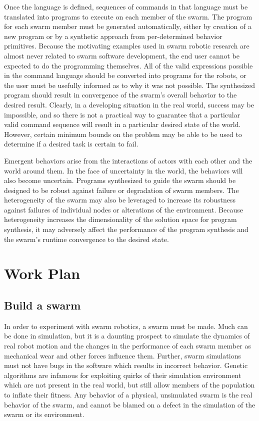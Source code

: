 \documentclass[]{article}
\begin{document}
Once the language is defined, sequences of commands in that language must be translated into programs to execute on each member of the swarm. 
The program for each swarm member must be generated automatically, either by creation of a new program or by a synthetic approach from per-determined behavior primitives.
Because the motivating examples used in swarm robotic research are almost never related to swarm software development, the end user cannot be expected to do the programming themselves. 
All of the valid expressions possible in the command language should be converted into programs for the robots, or the user must be usefully informed as to why it was not possible. 
The synthesized program should result in convergence of the swarm's overall behavior to the desired result. 
Clearly, in a developing situation in the real world, success may be impossible, and so there is not a practical way to guarantee that a particular valid command sequence will result in a particular desired state of the world. 
However, certain minimum bounds on the problem may be able to be used to determine if a desired task is certain to fail.

Emergent behaviors arise from the interactions of actors with each other and the world around them. 
In the face of uncertainty in the world, the behaviors will also become uncertain. 
Programs synthesized to guide the swarm should be designed to be robust against failure or degradation of swarm members. 
The heterogeneity of the swarm may also be leveraged to increase its robustness against failures of individual nodes or alterations of the environment. 
Because heterogeneity increases the dimensionality of the solution space for program synthesis, it may adversely affect the performance of the program synthesis and the swarm's runtime convergence to the desired state.


\section{Work Plan}

\subsection{Build a swarm}

In order to experiment with swarm robotics, a swarm must be made.
Much can be done in simulation, but it is a daunting prospect to simulate the dynamics of real robot motion and the changes in the performance of each swarm member as mechanical wear and other forces influence them. 
Further, swarm simulations must not have bugs in the software which results in incorrect behavior. 
Genetic algorithms are infamous for exploiting quirks of their simulation environment which are not present in the real world, but still allow members of the population to inflate their fitness. 
Any behavior of a physical, unsimulated swarm is the real behavior of the swarm, and cannot be blamed on a defect in the simulation of the swarm or its environment. 
\end{document}
